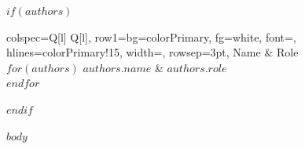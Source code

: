 \documentclass[11pt, a4paper]{article}
\begin{document}
$if(authors)$
\vspace{0.7cm}
\\[4pt]
\noindent\begin{tblr}{
  colspec={Q[l] Q[l]}, row{1}={bg=colorPrimary, fg=white, font=\bfseries},
  hlines={colorPrimary!15}, width=\linewidth, rowsep=3pt,
}
Name & Role \\
$for(authors)$
$authors.name$ & $authors.role$ \\
$endfor$
\end{tblr}
$endif$

\clearpage

{\hypersetup{linkcolor=colorPrimary}
\renewcommand{\contentsname}{\color{colorPrimary}Contents}
\tableofcontents}
\clearpage

$body$
\end{document}
